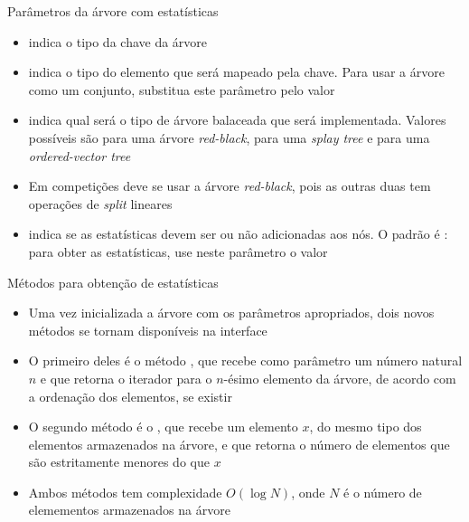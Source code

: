 \begin{frame}[fragile]{Parâmetros da árvore com estatísticas}

    \begin{itemize}
        \item {} indica o tipo da chave da árvore

        \item {} indica o tipo do elemento que será mapeado pela chave. 
            Para usar a árvore como um conjunto, substitua este parâmetro pelo
            valor 

        \item {} indica qual será o tipo de árvore balaceada que será implementada.
            Valores possíveis são  para uma árvore \textit{red-black},
             para uma \textit{splay tree} e  para
            uma \textit{ordered-vector tree}

        \item Em competições deve se usar a árvore \textit{red-black}, pois as outras duas tem operações
            de \textit{split} lineares

        \item {} indica se as estatísticas devem ser ou não adicionadas aos nós. O padrão é : para obter as estatísticas, use neste parâmetro o valor 
    \end{itemize}
\end{frame}

\begin{frame}[fragile]{Métodos para obtenção de estatísticas}

    \begin{itemize}
        \item Uma vez inicializada a árvore com os parâmetros apropriados, dois novos métodos se
            tornam disponíveis na interface

        \item O primeiro deles é o método , que recebe como parâmetro um
            número natural $n$ e que retorna o iterador para o $n$-ésimo elemento da árvore, de acordo
            com a ordenação dos elementos, se existir

        \item O segundo método é o , que recebe um elemento $x$, do mesmo tipo
            dos elementos armazenados na árvore, e que retorna o número de elementos que são estritamente
            menores do que $x$

        \item Ambos métodos tem complexidade $O(\log N)$, onde $N$ é o número de elemementos armazenados
            na árvore
    \end{itemize}
\end{frame}

